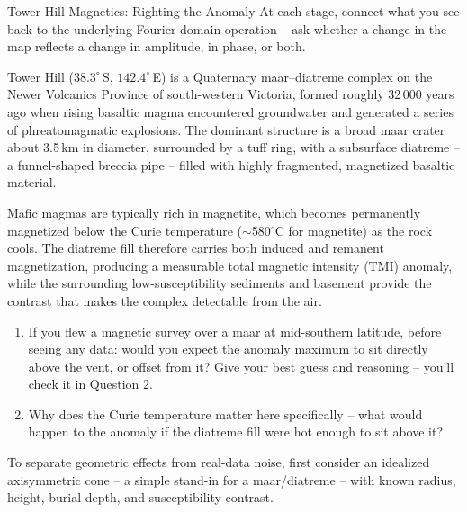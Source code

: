 \begin{activity}{Tower Hill Magnetics: Righting the Anomaly}
At each stage, connect what you see back to the underlying Fourier-domain operation -- ask whether a change in the map reflects a change in amplitude, in phase, or both.

\begin{questions}


        Tower Hill ($38.3^\circ$\,S, $142.4^\circ$\,E) is a Quaternary maar--diatreme complex on the Newer Volcanics Province of south-western Victoria, formed roughly 32\,000 years ago when rising basaltic magma encountered groundwater and generated a series of phreatomagmatic explosions. The dominant structure is a broad maar crater about 3.5\,km in diameter, surrounded by a tuff ring, with a subsurface diatreme -- a funnel-shaped breccia pipe -- filled with highly fragmented, magnetized basaltic material.

        Mafic magmas are typically rich in magnetite, which becomes permanently magnetized below the Curie temperature ($\sim$580$^\circ$C for magnetite) as the rock cools. The diatreme fill therefore carries both induced and remanent magnetization, producing a measurable total magnetic intensity (TMI) anomaly, while the surrounding low-susceptibility sediments and basement provide the contrast that makes the complex detectable from the air.

        \begin{enumerate}[label=\roman*]
            \item If you flew a magnetic survey over a maar at mid-southern latitude, before seeing any data: would you expect the anomaly maximum to sit directly above the vent, or offset from it? Give your best guess and reasoning -- you'll check it in Question 2.
            \answerbox[2.5cm]

            \item Why does the Curie temperature matter here specifically -- what would happen to the anomaly if the diatreme fill were hot enough to sit above it?
            \answerbox[2cm]
        \end{enumerate}


        To separate geometric effects from real-data noise, first consider an idealized axisymmetric cone -- a simple stand-in for a maar/diatreme -- with known radius, height, burial depth, and susceptibility contrast.


\end{questions}
\end{activity}
